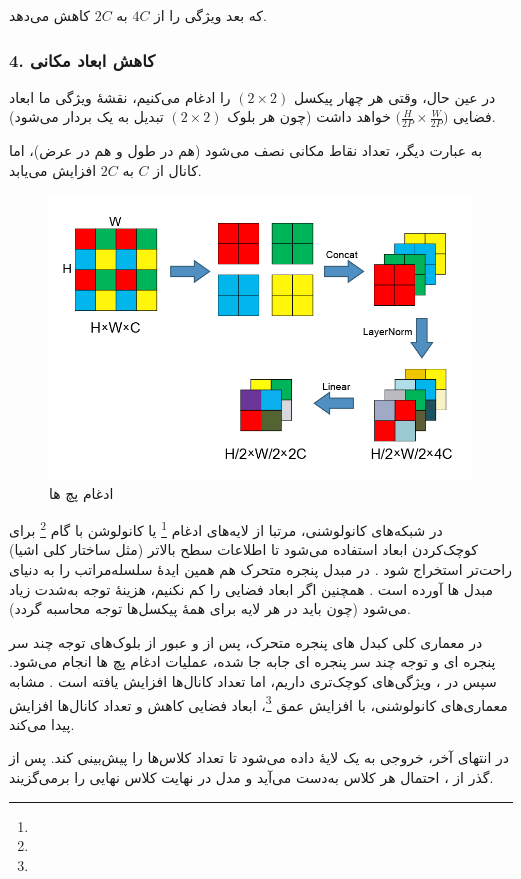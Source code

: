 که بعد ویژگی را از \(\displaystyle 4C\) به \(\displaystyle 2C\) کاهش می‌دهد.

\subsubsection{4. کاهش ابعاد مکانی}
در عین حال، وقتی هر چهار پیکسل \((2 \times 2)\) را ادغام می‌کنیم، 
نقشهٔ ویژگی ما ابعاد فضایی \(\bigl(\tfrac{H}{2P} \times \tfrac{W}{2P}\bigr)\) خواهد داشت 
(چون هر بلوک \((2 \times 2)\) تبدیل به یک بردار می‌شود).

به عبارت دیگر، تعداد نقاط مکانی نصف می‌شود (هم در طول و هم در عرض)، 
اما کانال از \(\displaystyle C\) به \(\displaystyle 2C\) افزایش می‌یابد.

\begin{figure}[h]
	\centering
	\begin{minipage}[b]{1\textwidth}
		\centering
		\includegraphics[width=\textwidth]{transformer_images/Patch_merging_new.png}
		\caption{ادغام پچ ها}
		\label{fig:patch merging in Swin Transformer}
	\end{minipage}
	\hfill
\end{figure}

در شبکه‌های کانولوشنی، مرتبا از لایه‌های ادغام \footnote{} یا کانولوشن با گام \footnote{} 
برای کوچک‌کردن ابعاد استفاده می‌شود تا اطلاعات سطح بالاتر (مثل ساختار کلی اشیا) راحت‌تر استخراج شود \cite{he2016deep}.  در مبدل پنجره متحرک هم همین ایدهٔ سلسله‌مراتب را به دنیای مبدل ها آورده است \cite{liu2021swintransformer}.  
همچنین اگر ابعاد فضایی را کم نکنیم، هزینهٔ توجه به‌شدت زیاد می‌شود 
(چون باید در هر لایه برای همهٔ پیکسل‌ها توجه محاسبه گردد).

در معماری کلی کبدل های پنجره متحرک، پس از  و عبور از بلوک‌های توجه چند سر پنجره ای و توجه چند سر پنجره ای جابه جا شده، عملیات  ادغام پچ ها انجام می‌شود. سپس در ، ویژگی‌های کوچک‌تری داریم، اما تعداد کانال‌ها افزایش یافته است \cite{liu2021swintransformer}.  
مشابه معماری‌های کانولوشنی، با افزایش عمق \footnote{}، ابعاد فضایی کاهش و تعداد کانال‌ها افزایش پیدا می‌کند.

در انتهای  آخر، خروجی به یک لایهٔ  داده می‌شود تا تعداد کلاس‌ها را پیش‌بینی کند.  
پس از گذر از ، احتمال هر کلاس به‌دست می‌آید و مدل در نهایت کلاس نهایی را برمی‌گزیند.






